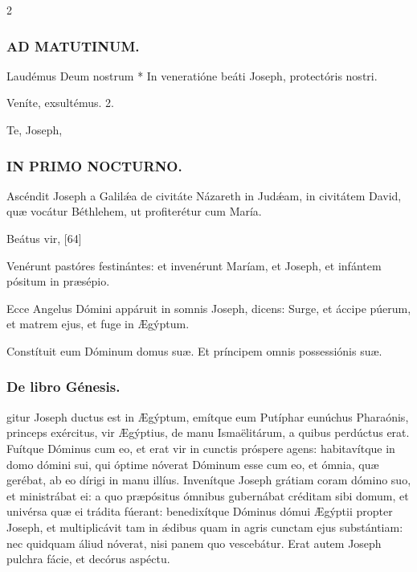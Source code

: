 \documentclass[9pt,twoside]{extarticle}
\begin{document}
\begin{multicols}{2}
\subsubsection*{\center \textsc{AD MATUTINUM.}}
\begin{tightlist}{}
\item {} Laudémus Deum nostrum * In veneratióne beáti Joseph, protectóris nostri.
\item {} Veníte, exsultémus. 2.
\item {} Te, Joseph, 
\end{tightlist}

\subsubsection*{\center \textsc{IN PRIMO NOCTURNO.}}
\begin{tightlist}{}
\item {} Ascéndit Joseph a Galilǽa de civitáte Názareth in Judǽam, in civitátem David, quæ vocátur Béthlehem, ut profiterétur cum María.
\item {} Beátus vir,  [64]
\item {} Venérunt pastóres festinántes: et invenérunt Maríam, et Joseph, et infántem pósitum in præsépio.
\item {} Ecce Angelus Dómini appáruit in somnis Joseph, dicens: Surge, et áccipe púerum, et matrem ejus, et fuge in Ægýptum.
\item {} Constítuit eum Dóminum domus suæ.  Et príncipem omnis possessiónis suæ.
\item {}
\end{tightlist}

\subsubsection*{\center De libro Génesis.}
\begin{center}\end{center}
gitur Joseph ductus est in Ægýptum, emítque eum Putíphar eunúchus Pharaónis, princeps exércitus, vir Ægýptius, de manu Ismaëlitárum, a quibus perdúctus erat.
Fuítque Dóminus cum eo, et erat vir in cunctis próspere agens: habitavítque in domo dómini sui,
qui óptime nóverat Dóminum esse cum eo, et ómnia, quæ gerébat, ab eo dírigi in manu illíus.
Invenítque Joseph grátiam coram dómino suo, et ministrábat ei: a quo præpósitus ómnibus gubernábat créditam sibi domum, et univérsa quæ ei trádita fúerant:
benedixítque Dóminus dómui Ægýptii propter Joseph, et multiplicávit tam in ǽdibus quam in agris cunctam ejus substántiam:
nec quidquam áliud nóverat, nisi panem quo vescebátur. Erat autem Joseph pulchra fácie, et decórus aspéctu.


\end{multicols}
\end{document}
